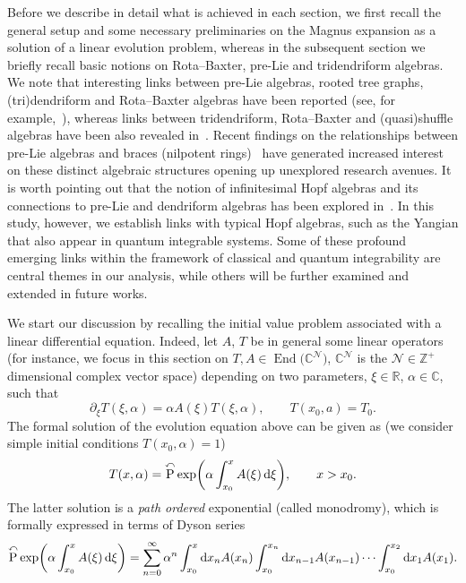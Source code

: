 \documentclass[pdftex]{sigma}
\numberwithin{equation}{section}
\newcounter{diff_order}
\newcounter{diff_power}
\theoremstyle{definition}
\DeclareMathOperator{\EEnd}{End}%
\begin{document}
Before we describe in detail what is achieved in each section, we first recall the general setup and some necessary preliminaries on the Magnus expansion as a solution of a linear evolution problem, whereas in the subsequent section we briefly recall basic notions on Rota--Baxter, pre-Lie and tridendriform algebras.
We note that interesting links between pre-Lie algebras, rooted tree graphs, (tri)dendriform and Rota--Baxter algebras have been reported (see, for example,~\mbox{\cite{RBLoday, Ebra2, EbraMan, Dendri}}), whereas links between tridendriform, Rota--Baxter and (quasi)shuffle algebras have been also revealed in~\cite{LodaySh}. Recent findings on the relationships between pre-Lie algebras and braces (nilpotent rings)~\cite{Rump, Smok1, Smok2} have generated increased interest on these distinct algebraic structures opening up unexplored research avenues.
It is worth pointing out that the notion of infinitesimal Hopf algebras and its connections to pre-Lie and dendriform algebras has been explored in~\cite{Aguiar, Aguiar1}. In this study, however, we establish links with typical Hopf algebras, such as the Yangian that also appear in quantum integrable systems.
Some of these profound emerging links within the framework of classical and quantum integrability
{are central themes in our analysis}, while others will be further examined and extended in future works.

We start our discussion by recalling the
initial value problem associated with a linear differential equation. Indeed,
let $A$, $T$ be in general some linear operators (for instance, we focus in this section on $T, A \in \EEnd\bigl({\mathbb C}^{\mathcal N}\bigr)$, ${\mathbb C}^{\mathcal N}$ is the ${\mathcal N} \in {\mathbb Z}^+$ dimensional complex vector space) depending on two parameters, $\xi \in {\mathbb R}$, $\alpha \in {\mathbb C}$, such that
\begin{equation}
\partial_{\xi} T(\xi, \alpha) = \alpha A(\xi) T(\xi, \alpha), \qquad T(x_0,a) =T_0. \label{evo1}
\end{equation}
The formal solution of the evolution equation above can be given as
(we consider simple initial conditions $T(x_0, \alpha) =1$)
\begin{equation}
T(x, \alpha
) = \overset{\curvearrowleft} {\mathrm P} \exp \biggl(\alpha\int_{x_0}^{x}A(\xi) \,{\rm d} \xi\biggr), \qquad x>x_0. \label{eq:CTS_T}
\end{equation}
The latter solution is a {\it path ordered} exponential (called monodromy), which is formally
expressed in terms of Dyson series~\cite{Dyson}
\begin{gather}
\overset{\curvearrowleft} {\mathrm P} \exp\biggl( \alpha \int_{x_0}^{x} A(\xi) \,{\rm d} \xi \biggr)
=
\sum_{n=0}^{\infty}\alpha^n \int_{x_0}^x {\rm d}x_n A(x_n)
\int_{x_0}^{x_n }{\rm d}x_{n-1}A(x_{n-1}) \cdots \int_{x_0}^{x_2} {\rm d}x_{1} A(x_{1}). \label{12b}
\end{gather}
\end{document}
